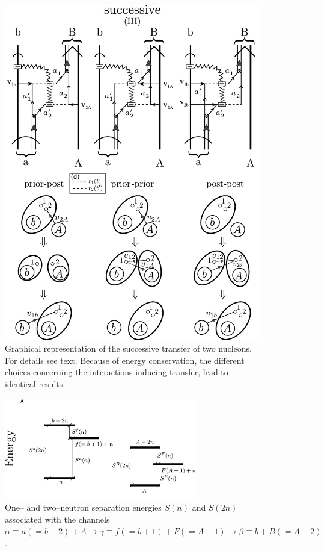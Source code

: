  \begin{figure}[h!]
 	\begin{center}
\includegraphics*[width=\textwidth]{C7/figs_C7/Reaction2}
\end{center}
	\caption{Graphical representation of  the successive transfer of two nucleons. For details see text. Because of energy conservation, the different choices concerning the interactions inducing transfer, lead to identical results.}
\label{figC7C2}
\end{figure}
 \begin{figure}
 	\begin{center}
\includegraphics*[width=0.75\textwidth]{C7/figs_C7/figC7C3}
\end{center}
\caption{One-- and two--neutron separation energies $S(n)$ and $S(2n)$ associated with the channels $\alpha\equiv a(=b+2)+A \rightarrow \gamma \equiv f(=b+1)+F(=A+1)\rightarrow \beta \equiv b+B(=A+2)$.}\label{figC7C3}
\end{figure}
